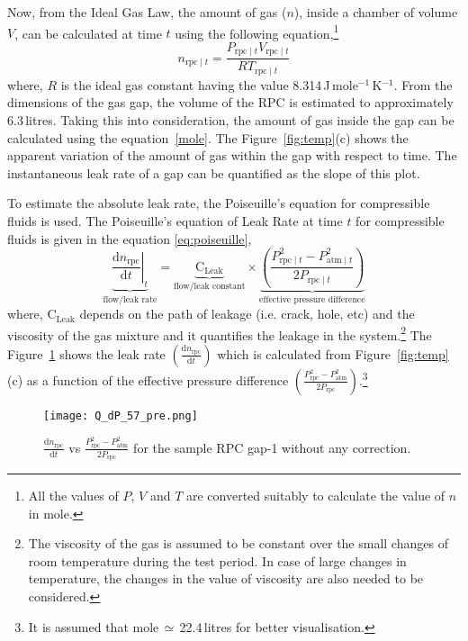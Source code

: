 Now, from the Ideal Gas Law, the amount of gas ($n$), inside a chamber of
volume $V$, can be calculated at time $t$ using the following equation,\footnote{All the values of $P$, $V$ and $T$ are converted suitably to calculate the value of $n$ in mole.}
\begin{equation}
  n_{\textrm{rpc}\mid t}=\frac{P_{\textrm{rpc}\mid t}V_{\textrm{rpc}\mid t}}{RT_{\textrm{rpc}\mid t}} \label{mole}
\end{equation}
where, $R$ is the ideal gas constant having the value
8.314\,J\,mole$^{-1}$\,K$^{-1}$. From the dimensions of the gas gap, the volume
of the RPC is estimated to approximately 6.3\,litres. Taking this into
consideration, the amount of gas inside the gap can be calculated using the
equation~\ref{mole}. The Figure~\ref{fig:temp}(c) shows the apparent variation
of the amount of gas within the gap with respect to time. The instantaneous
leak rate of a gap can be quantified as the slope of this plot.

To estimate the absolute leak rate, the Poiseuille's equation for compressible
fluids\cite{poiseuille} is used. The Poiseuille's equation of Leak Rate at time
$t$ for compressible fluids is given in the equation \ref{eq:poiseuille},
\begin{equation}
  \underbrace{\left.\frac{\mathrm{d}n_{\textrm{rpc}}}{\mathrm{d}t}\right| _t}_\text{flow/leak rate}=\underbrace{\textrm{C}_{\textrm{Leak}}}_\text{flow/leak constant}\times\underbrace{\left(\frac {P_{{\textrm{rpc}\mid t} }^{2}-P_{{\textrm{atm}\mid t} }^{2}}{2P_{{\textrm{rpc}\mid t} }}\right)}_\text{effective pressure difference}\label{eq:poiseuille}
\end{equation}
where, $\textrm{C}_{\textrm{Leak}}$ depends on the path of leakage (i.e. crack,
hole, etc) and the viscosity of the gas mixture and it quantifies the leakage
in the system.\footnote{The viscosity of the gas is assumed to be constant over
  the small changes of room temperature during the test period. In case of
  large changes in temperature, the changes in the value of viscosity are also
  needed to be considered.} The Figure~\ref{fig:preQt} shows the leak rate
$\left(\frac{\mathrm{d}n_{\textrm{rpc}}}{\mathrm{d}t}\right)$ which is calculated
from Figure~\ref{fig:temp}(c) as a function of the effective pressure
difference $\left(\frac{P_{\textrm{rpc}}^{2}-P_{\textrm{atm}}^{2}}{2P_{\textrm{rpc}}}\right)$.\footnote{It is assumed that mole\,$\simeq$\,22.4\,litres for better visualisation.} 
\begin{figure}
  \centering
  \texttt{[image: Q\_dP\_57\_pre.png]}
  \caption{$\frac{\mathrm{d}n_{\textrm{rpc}}}{\mathrm{d}t}$ vs
    $\frac{P_{\textrm{rpc}}^{2}-P_{\textrm{atm}}^{2}}{2P_{\textrm{rpc}}}$ for the sample
    RPC gap-1 without any correction.}
  \label{fig:preQt}
\end{figure}

